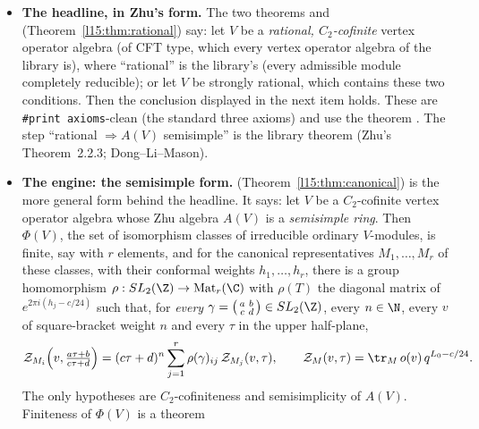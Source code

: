 \begin{itemize}
\item \textbf{The headline, in Zhu's form.} The two theorems \allowbreak{}\allowbreak{}\allowbreak{}
  and \allowbreak{}\allowbreak{} (Theorem~\ref{l15:thm:rational})
  say: let $V$ be a \emph{rational, $C_2$-cofinite} vertex operator algebra (of CFT type, which every vertex operator algebra
  of the library is), where ``rational'' is the library's  (every admissible module completely
  reducible); or let $V$ be strongly rational, which contains these two conditions. Then the conclusion displayed in the
  next item holds. These are \texttt{\#print axioms}-clean (the standard three axioms) and use the theorem .
  The step ``rational $\Rightarrow A(V)$ semisimple'' is the library theorem
  \allowbreak{}\allowbreak{} (Zhu's Theorem~2.2.3; Dong--Li--Mason).
\item \textbf{The engine: the semisimple form.} \allowbreak{}\allowbreak{}
  (Theorem~\ref{l15:thm:canonical}) is the more general form behind the headline. It says: let $V$ be a $C_2$-cofinite vertex
  operator algebra whose Zhu algebra $A(V)$ is a \emph{semisimple ring}. Then $\Phi(V)$, the set
  of isomorphism classes of irreducible ordinary $V$-modules, is finite, say with $r$ elements, and for the canonical
  representatives $M_1,\dots,M_r$ of these classes, with their conformal weights $h_1,\dots,h_r$, there is a group
  homomorphism $\rho:\lfifteenSL\to\mathrm{Mat}_r(\C)$ with $\rho(T)$ the diagonal matrix of $e^{2\pi i(h_j-c/24)}$ such
  that, for \emph{every} $\gamma=\left(\begin{smallmatrix}a&b\\ c&d\end{smallmatrix}\right)\in\lfifteenSL$, every $n\in\N$,
  every $v$ of square-bracket weight $n$ and every $\tau$ in the upper half-plane,
  \begin{equation*}
    \lfifteenZ_{M_i}\!\left(v,\tfrac{a\tau+b}{c\tau+d}\right)=(c\tau+d)^n\sum_{j=1}^r\rho(\gamma)_{ij}\,\lfifteenZ_{M_j}(v,\tau),
    \qquad \lfifteenZ_{M}(v,\tau)=\tr_{M}\,o(v)\,q^{L_0-c/24}.
  \end{equation*}
  The only hypotheses are $C_2$-cofiniteness and semisimplicity of $A(V)$. Finiteness of $\Phi(V)$ is a theorem

\end{itemize}
